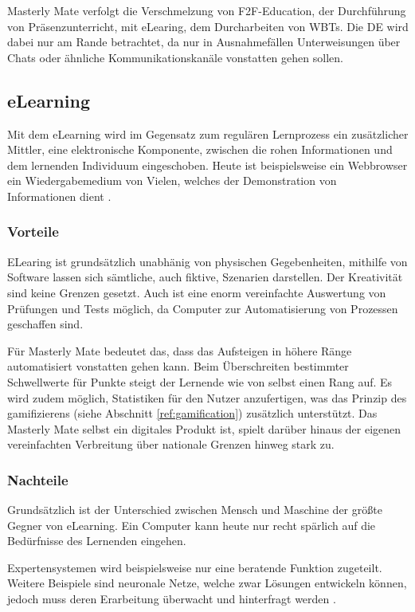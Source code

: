 Masterly Mate verfolgt die Verschmelzung von F2F-Education, der Durchführung von
Präsenzunterricht, mit eLearing, dem Durcharbeiten von WBTs. Die DE wird dabei
nur am Rande betrachtet, da nur in Ausnahmefällen Unterweisungen über Chats oder
ähnliche Kommunikationskanäle vonstatten gehen sollen.

\subsection{eLearning}
Mit dem eLearning wird im Gegensatz zum regulären Lernprozess ein zusätzlicher
Mittler, eine elektronische Komponente, zwischen die rohen Informationen und dem
lernenden Individuum eingeschoben. Heute ist beispielsweise ein Webbrowser ein
Wiedergabemedium von Vielen, welches der Demonstration von Informationen dient
\cite{baumgartner:2002}.

\subsubsection{Vorteile}
ELearing ist grundsätzlich unabhänig von physischen Gegebenheiten, mithilfe von
Software lassen sich sämtliche, auch fiktive, Szenarien darstellen. Der
Kreativität sind keine Grenzen gesetzt. Auch ist eine enorm vereinfachte
Auswertung von Prüfungen und Tests möglich, da Computer zur Automatisierung von
Prozessen geschaffen sind. 

Für Masterly Mate bedeutet das, dass das Aufsteigen in höhere Ränge
automatisiert vonstatten gehen kann. Beim Überschreiten bestimmter Schwellwerte für Punkte
steigt der Lernende wie von selbst einen Rang auf. Es wird zudem möglich,
Statistiken für den Nutzer anzufertigen, was das Prinzip des gamifizierens
(siehe Abschnitt \ref{ref:gamification}) zusätzlich unterstützt. Das
Masterly Mate selbst ein digitales Produkt ist, spielt darüber hinaus der
eigenen vereinfachten Verbreitung über nationale Grenzen hinweg stark zu.

\subsubsection{Nachteile}  
Grundsätzlich ist der Unterschied zwischen Mensch und Maschine der größte
Gegner von eLearning. Ein Computer kann heute nur recht spärlich auf die
Bedürfnisse des Lernenden eingehen. 

Expertensystemen wird beispielsweise nur eine beratende Funktion zugeteilt.
Weitere Beispiele sind neuronale Netze, welche zwar Lösungen entwickeln können,
jedoch muss deren Erarbeitung überwacht und hinterfragt werden
\cite{keller:2000}.

